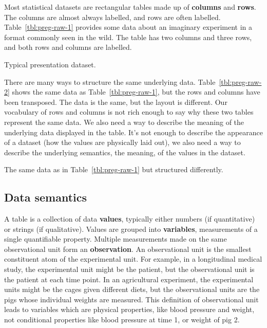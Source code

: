 \documentclass[article]{jss}
\begin{document}
Most statistical datasets are rectangular tables made up of \textbf{columns} and \textbf{rows}. The columns are almost always labelled, and rows are often labelled. Table~\ref{tbl:preg-raw-1} provides some data about an imaginary experiment in a format commonly seen in the wild. The table has two columns and three rows, and both rows and columns are labelled.

\begin{table}[htbp]
  \centering
  
  \caption{Typical presentation dataset.}
  \label{tbl:preg-raw-1}
\end{table}

There are many ways to structure the same underlying data. Table~\ref{tbl:preg-raw-2} shows the same data as Table~\ref{tbl:preg-raw-1}, but the rows and columns have been transposed. The data is the same, but the layout is different. Our vocabulary of rows and columns is not rich enough to say why these two tables represent the same data. We also need a way to describe the meaning of the underlying data displayed in the table. It's not enough to describe the appearance of a dataset (how the values are physically laid out), we also need a way to describe the underlying semantics, the meaning, of the values in the dataset.

\begin{table}[htbp]
  \centering
  
  \caption{The same data as in Table~\ref{tbl:preg-raw-1} but structured differently.}
  \label{tbl:preg-raw-2}
\end{table}

\subsection{Data semantics}

A table is a collection of data \textbf{values}, typically either numbers (if quantitative) or strings (if qualitative). Values are grouped into \textbf{variables}, measurements of a single quantifiable property. Multiple measurements made on the same observational unit form an \textbf{observation}. An observational unit is the smallest constituent atom of the experimental unit. For example, in a longitudinal medical study, the experimental unit might be the patient, but the observational unit is the patient at each time point. In an agricultural experiment, the experimental units might be the cages given different diets, but the observational units are the pigs whose individual weights are measured. This definition of observational unit leads to variables which are physical properties, like blood pressure and weight, not conditional properties like blood pressure at time 1, or weight of pig 2.
\end{document}

